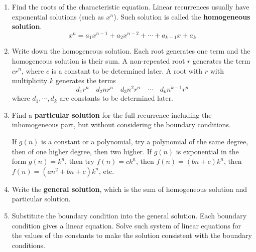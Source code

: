 \begin{enumerate}
    \item Find the roots of the characteristic equation. Linear recurrences usually have exponential solutions (such as $x^n$). Such solution is called the \textbf{homogeneous solution}.
    $$
    x^n = a_1 x^{n-1} + a_2 x^{n-2} + \cdots + a_{k-1} x + a_k
    $$
    \item Write down the homogeneous solution. Each root generates one term and the homogeneous solution is their sum. A non-repeated root $r$ generates the term $cr^n$, where $c$ is a constant to be determined later. A root with $r$ with multiplicity $k$ generates the terms
    $$
    d_1r^n \quad d_2nr^n \quad d_3n^2r^n \quad \cdots \quad d_kn^{k-1}r^n
    $$
    where $d_1,\cdots,d_k$ are constants to be determined later.
    \item Find a \textbf{particular solution} for the full recurrence including the inhomogeneous part, but without considering the boundary conditions.
    
    If $g(n)$ is a constant or a polynomial, try a polynomial of the same degree, then of one higher degree, then two higher. If $g(n)$ is exponential in the form $g(n) = k^n$, then try $f(n) = ck^n$, then $f(n) = (bn+c)k^n$, then $f(n) = (an^2+bn+c)k^n$, etc.
    
    \item Write the \textbf{general solution}, which is the sum of homogeneous solution and particular solution.
    \item Substitute the boundary condition into the general solution. Each boundary condition gives a linear equation. Solve such system of linear equations for the values of the constants to make the solution consistent with the boundary conditions.
\end{enumerate}
